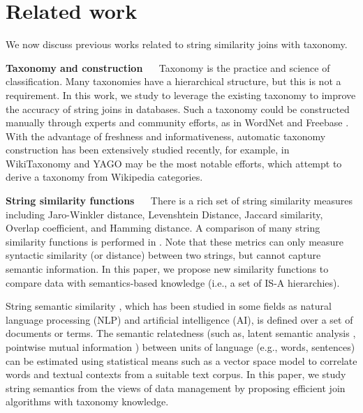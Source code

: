 \section{Related work} \label{sec:relatedwork}

We now discuss previous works related to string similarity joins with taxonomy.

\noindent \textbf{Taxonomy and construction}  ~~ Taxonomy is the practice and science of classification. Many taxonomies have a hierarchical structure, but this is not a requirement. In this work, we study to leverage the existing taxonomy to improve the accuracy of string  joins in databases. Such a taxonomy could be constructed manually
through experts and community efforts, as in WordNet \cite{books/fellbaum1998wordnet} and Freebase \cite{conf/aaai/BollackerCT07}. With the advantage of freshness
and informativeness, automatic taxonomy construction has
been extensively studied recently, for example, in WikiTaxonomy \cite{conf/ecai/PonzettoS08} and YAGO \cite{conf/cidr/MahdisoltaniBS15}  may be the most notable efforts, which attempt to derive a taxonomy from Wikipedia categories.

\smallskip





\noindent \textbf{String similarity functions} ~~ There is a rich set of string similarity measures including Jaro-Winkler distance, Levenshtein Distance,  Jaccard similarity, Overlap coefficient, and Hamming distance. A comparison of many string similarity functions is performed in \cite{conf/ijcai/CohenRF03}. Note that these metrics can only measure syntactic similarity (or distance) between two strings, but cannot capture semantic information. In this paper, we propose new similarity functions to compare data with semantics-based knowledge (i.e., a set of IS-A hierarchies).


String semantic similarity \cite{conf/cikm/SayedHZ07,conf/cl/WuP94,journals/jair/Resnik99}, which has been studied in some fields as natural language processing (NLP) and artificial intelligence (AI), is defined over a set of documents or terms. The semantic relatedness (such as, latent semantic analysis \cite{conf/cscl/LandauerD02},  pointwise mutual information \cite{conf/pkdd/Schneider05} )  between units of language (e.g., words, sentences) can be estimated using statistical means such as a vector space model to correlate words and textual contexts from a suitable text corpus. In this paper, we study string semantics from the views of data management by proposing efficient join algorithms with taxonomy knowledge.

